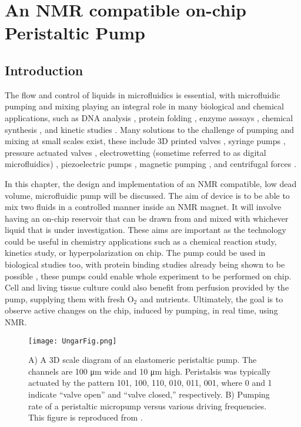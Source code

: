 
\chapter{An NMR compatible on-chip Peristaltic Pump}\label{Chapter:Peristaltics}

\section{Introduction}

The flow and control of liquids in microfluidics is essential, with microfluidic pumping
and mixing playing an integral role in many biological and chemical applications, such as
DNA analysis \citep{RN74, RN75}, protein folding \citep{RN76}, enzyme asssays \citep{RN77, RN78},
chemical synthesis \citep{RN79,RN80}, and kinetic studies \citep{RN81, RN82}. Many solutions to
the challenge of pumping and mixing at small scales exist, these include 3D printed valves \citep{RN83, RN84},
syringe pumps \citep{RN85,RN86,RN87}, pressure actuated valves \citep{RN88, RN89, RN90}, electrowetting
(sometime referred to as digital microfluidics) \citep{RN91, RN92}, piezoelectric pumps \citep{RN93, RN94},
magnetic pumping \citep{RN95,RN96}, and centrifugal forces \citep{RN97, RN98, RN99}.

In this chapter, the design and implementation of an NMR compatible, low dead volume,
microfluidic pump will be discussed. The aim of device is to be able to mix two fluids in a
controlled manner inside an NMR magnet. It will involve having an on-chip reservoir that
can be drawn from and mixed with whichever liquid that is under investigation. These aims
are important as the technology could be useful in chemistry applications such as a chemical
reaction study, kinetics study, or hyperpolarization on chip. The pump could be used in
biological studies too, with protein binding studies already being shown to be possible \citep{RN26},
these pumps could enable whole experiment to be performed on chip. Cell and living tissue
culture could also benefit from perfusion provided by the pump, supplying them with fresh O$_2$
and nutrients. Ultimately, the goal is to observe active changes on the chip, induced by
pumping, in real time, using NMR.

\begin{figure}
\begin{center}
  \texttt{[image: UngarFig.png]}
\end{center}
  \caption{A) A 3D scale diagram of an elastomeric peristaltic pump. The channels are 100 μm wide and 10 μm high.
  Peristalsis was typically actuated by the pattern 101, 100, 110, 010, 011, 001, where 0 and 1 indicate “valve open”
  and “valve closed,” respectively. B) Pumping rate of a peristaltic micropump versus various driving frequencies. This
  figure is reproduced from \citep{RN59}.}
  \label{fig:Ungar}
\end{figure}

